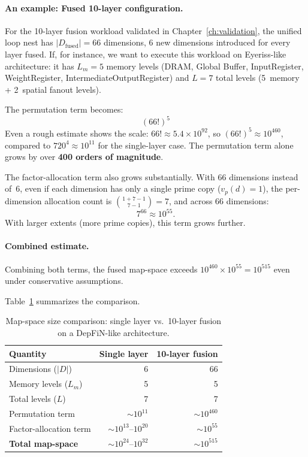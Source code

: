 \paragraph{An example: Fused 10-layer configuration.}
For the 10-layer fusion workload validated in Chapter~\ref{ch:validation},
the unified loop nest has $|D_{\text{fused}}| = 66$ dimensions, 6 new dimensions introduced for every layer fused.
If, for instance, we want to execute this workload on Eyeriss-like architecture: it has $L_m = 5$ memory levels (DRAM,
Global Buffer, InputRegister, WeightRegister, IntermediateOutputRegister) and $L = 7$ total levels (5~memory + 2~spatial
fanout levels).

The permutation term becomes:
%
\begin{equation}
\label{eq:fused-perms}
(66!)^{5}
\end{equation}
%
Even a rough estimate shows the scale:
$66! \approx 5.4 \times 10^{92}$, so
$(66!)^5 \approx 10^{460}$, compared to $720^4 \approx 10^{11}$ for
the single-layer case.
The permutation term alone grows by over \textbf{400 orders of
magnitude}.

The factor-allocation term also grows substantially.
With 66 dimensions instead of~6,
even if each dimension has only a single prime copy
($v_p(d) = 1$), the per-dimension allocation count is
$\binom{1 + 7 - 1}{7 - 1} = 7$, and across 66 dimensions:
\[
7^{66} \approx 10^{55}.
\]
With larger extents (more prime copies), this term grows further.

\paragraph{Combined estimate.}
Combining both terms, the fused map-space exceeds
$10^{460} \times 10^{55} = 10^{515}$ even under conservative
assumptions.

Table~\ref{tab:mapspace-comparison} summarizes the comparison.

\begin{table}[htbp]
  \centering
  \caption{Map-space size comparison: single layer vs.\ 10-layer
           fusion on a DepFiN-like architecture.}
  \label{tab:mapspace-comparison}
  \small
  \begin{tabular}{l r r}
    \toprule
    \textbf{Quantity}
      & \textbf{Single layer}
      & \textbf{10-layer fusion} \\
    \midrule
    Dimensions ($|D|$)          & 6     & 66 \\
    Memory levels ($L_m$)       & 5& 5\\
    Total levels ($L$)          & 7& 7\\
    Permutation term            & $\sim\!10^{11}$
                                & $\sim\!10^{460}$\\
    Factor-allocation term      & $\sim\!10^{13}$--$10^{20}$
                                & $\sim10^{55}$\\
    \addlinespace
    \textbf{Total map-space}    & $\sim\!10^{24}$--$10^{32}$
                                & $\sim10^{515}$\\
    \bottomrule
  \end{tabular}
\end{table}



